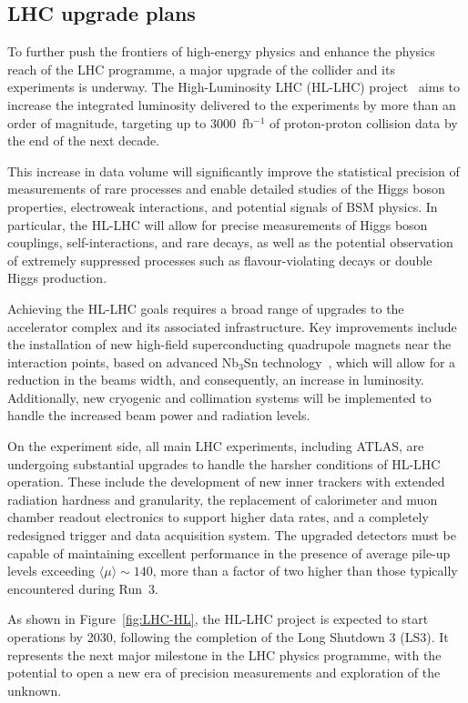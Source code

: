 \subsection{LHC upgrade plans}

To further push the frontiers of high-energy physics and enhance the physics reach of the LHC programme, a major upgrade of the collider and its experiments is underway. The High-Luminosity LHC (HL-LHC) project~\cite{HLLHC} aims to increase the integrated luminosity delivered to the experiments by more than an order of magnitude, targeting up to 3000~fb$^{-1}$ of proton-proton collision data by the end of the next decade.

This increase in data volume will significantly improve the statistical precision of measurements of rare processes and enable detailed studies of the Higgs boson properties, electroweak interactions, and potential signals of BSM physics. In particular, the HL-LHC will allow for precise measurements of Higgs boson couplings, self-interactions, and rare decays, as well as the potential observation of extremely suppressed processes such as flavour-violating decays or double Higgs production.

Achieving the HL-LHC goals requires a broad range of upgrades to the accelerator complex and its associated infrastructure. Key improvements include the installation of new high-field superconducting quadrupole magnets near the interaction points, based on advanced Nb$_3$Sn technology~\cite{Mangiarotti:2770766}, which will allow for a reduction in the beams width, and consequently, an increase in luminosity. Additionally, new cryogenic and collimation systems will be implemented to handle the increased beam power and radiation levels.

On the experiment side, all main LHC experiments, including ATLAS, are undergoing substantial upgrades to handle the harsher conditions of HL-LHC operation. These include the development of new inner trackers with extended radiation hardness and granularity, the replacement of calorimeter and muon chamber readout electronics to support higher data rates, and a completely redesigned trigger and data acquisition system. The upgraded detectors must be capable of maintaining excellent performance in the presence of average pile-up levels exceeding $\langle\mu\rangle \sim 140$, more than a factor of two higher than those typically encountered during Run~3.

As shown in Figure~\ref{fig:LHC-HL}, the HL-LHC project is expected to start operations by 2030, following the completion of the Long Shutdown 3 (LS3). It represents the next major milestone in the LHC physics programme, with the potential to open a new era of precision measurements and exploration of the unknown.


